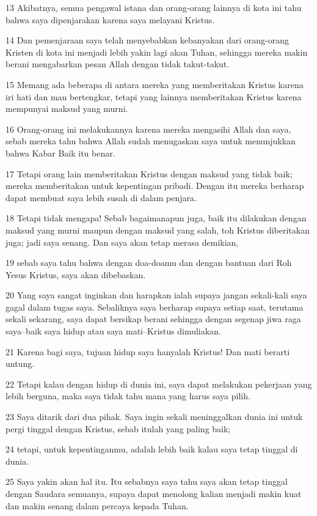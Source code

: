\par 13 Akibatnya, semua pengawal istana dan orang-orang lainnya di kota ini tahu bahwa saya dipenjarakan karena saya melayani Kristus.
\par 14 Dan pemenjaraan saya telah menyebabkan kebanyakan dari orang-orang Kristen di kota ini menjadi lebih yakin lagi akan Tuhan, sehingga mereka makin berani mengabarkan pesan Allah dengan tidak takut-takut.
\par 15 Memang ada beberapa di antara mereka yang memberitakan Kristus karena iri hati dan mau bertengkar, tetapi yang lainnya memberitakan Kristus karena mempunyai maksud yang murni.
\par 16 Orang-orang ini melakukannya karena mereka mengasihi Allah dan saya, sebab mereka tahu bahwa Allah sudah menugaskan saya untuk menunjukkan bahwa Kabar Baik itu benar.
\par 17 Tetapi orang lain memberitakan Kristus dengan maksud yang tidak baik; mereka memberitakan untuk kepentingan pribadi. Dengan itu mereka berharap dapat membuat saya lebih susah di dalam penjara.
\par 18 Tetapi tidak mengapa! Sebab bagaimanapun juga, baik itu dilakukan dengan maksud yang murni maupun dengan maksud yang salah, toh Kristus diberitakan juga; jadi saya senang. Dan saya akan tetap merasa demikian,
\par 19 sebab saya tahu bahwa dengan doa-doamu dan dengan bantuan dari Roh Yesus Kristus, saya akan dibebaskan.
\par 20 Yang saya sangat inginkan dan harapkan ialah supaya jangan sekali-kali saya gagal dalam tugas saya. Sebaliknya saya berharap supaya setiap saat, terutama sekali sekarang, saya dapat bersikap berani sehingga dengan segenap jiwa raga saya--baik saya hidup atau saya mati--Kristus dimuliakan.
\par 21 Karena bagi saya, tujuan hidup saya hanyalah Kristus! Dan mati berarti untung.
\par 22 Tetapi kalau dengan hidup di dunia ini, saya dapat melakukan pekerjaan yang lebih berguna, maka saya tidak tahu mana yang harus saya pilih.
\par 23 Saya ditarik dari dua pihak. Saya ingin sekali meninggalkan dunia ini untuk pergi tinggal dengan Kristus, sebab itulah yang paling baik;
\par 24 tetapi, untuk kepentinganmu, adalah lebih baik kalau saya tetap tinggal di dunia.
\par 25 Saya yakin akan hal itu. Itu sebabnya saya tahu saya akan tetap tinggal dengan Saudara semuanya, supaya dapat menolong kalian menjadi makin kuat dan makin senang dalam percaya kepada Tuhan.
